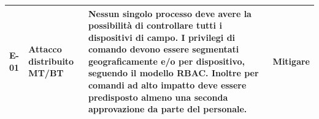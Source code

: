 \begin{longtable}{p{1.5cm}p{3.5cm}p{8cm}p{2.5cm}}
    E-01 & Attacco distribuito MT/BT & Nessun singolo processo deve avere la possibilità di controllare tutti i dispositivi di campo. I privilegi di comando devono essere segmentati geograficamente e/o per dispositivo, seguendo il modello RBAC. Inoltre per comandi ad alto impatto deve essere predisposto almeno una seconda approvazione da parte del personale. & Mitigare\\
    \hline
\end{longtable}



